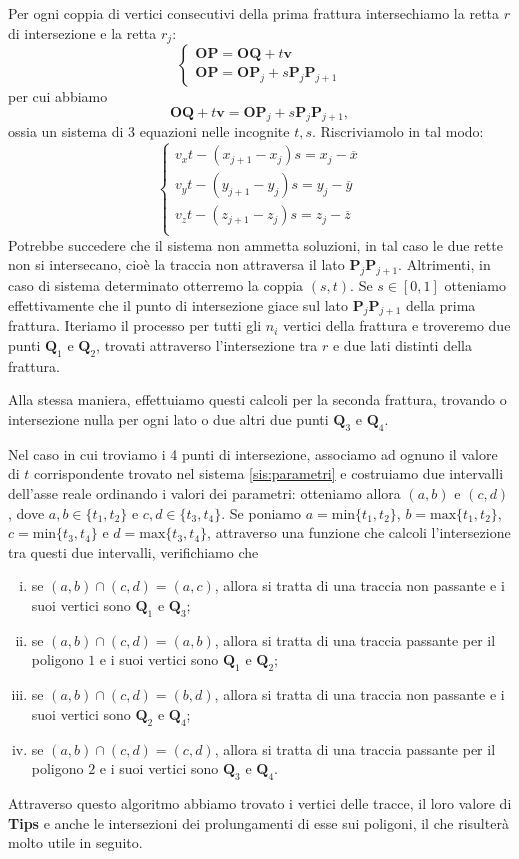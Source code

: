 \documentclass[a4paper]{article}
\newcommand{\B}{\mathbf}
\begin{document}
Per ogni coppia di vertici consecutivi della prima frattura intersechiamo la retta $r$ di intersezione e la retta $r_j$:
$$
\begin{cases}
\B{OP}=\B{OQ}+t\B{v} \\ 
\B{OP}=\B{OP}_j+s\B{P}_j\B{P}_{j+1}
\end{cases}
$$
per cui abbiamo $$\B{OQ}+t\B{v}=\B{OP}_j+s\B{P}_j\B{P}_{j+1},$$ ossia un sistema di $3$ equazioni nelle incognite $t,s$. Riscriviamolo in tal modo:
\begin{equation} \label{sis:parametri}
\begin{cases}
v_xt-(x_{j+1}-x_j)s=x_j-\overline{x} \\
v_yt-(y_{j+1}-y_j)s=y_j-\overline{y} \\
v_zt-(z_{j+1}-z_j)s=z_j-\overline{z} \\
\end{cases}
\end{equation}
Potrebbe succedere che il sistema non ammetta soluzioni, in tal caso le due rette non si intersecano, cioè la traccia non attraversa il lato $\B{P}_j\B{P}_{j+1}$. Altrimenti, in caso di sistema determinato otterremo la coppia $(s,t)$. Se $s\in[0,1]$ otteniamo effettivamente che il punto di intersezione giace sul lato $\B{P}_j\B{P}_{j+1}$ della prima frattura. Iteriamo il processo per tutti gli $n_i$ vertici della frattura e troveremo due punti $\B{Q}_1$ e $\B{Q}_2$, trovati attraverso l'intersezione tra $r$ e due lati distinti della frattura.

Alla stessa maniera, effettuiamo questi calcoli per la seconda frattura, trovando o intersezione nulla per ogni lato o due altri due punti $\B{Q}_3$ e $\B{Q}_4$.

Nel caso in cui troviamo i 4 punti di intersezione, associamo ad ognuno il valore di $t$ corrispondente trovato nel sistema \eqref{sis:parametri} e costruiamo due intervalli dell'asse reale ordinando i valori dei parametri: otteniamo allora $(a,b)$ e $(c,d)$, dove $a,b\in\{t_1,t_2\}$ e $c,d\in\{t_3,t_4\}$. Se poniamo $a=\text{min}\{t_1,t_2\}$, $b=\text{max}\{t_1,t_2\}$, $c=\text{min}\{t_3,t_4\}$ e $d=\text{max}\{t_3,t_4\}$, attraverso una funzione che calcoli l'intersezione tra questi due intervalli, verifichiamo che
\begin{enumerate} [(i)]
\item se $(a,b)\cap(c,d)=(a,c)$, allora si tratta di una traccia non passante e i suoi vertici sono $\B{Q}_1$ e $\B{Q}_3$;
\item se $(a,b)\cap(c,d)=(a,b)$, allora si tratta di una traccia passante per il poligono $1$ e i suoi vertici sono $\B{Q}_1$ e $\B{Q}_2$;
\item se $(a,b)\cap(c,d)=(b,d)$, allora si tratta di una traccia non passante e i suoi vertici sono $\B{Q}_2$ e $\B{Q}_4$;
\item se $(a,b)\cap(c,d)=(c,d)$, allora si tratta di una traccia passante per il poligono $2$ e i suoi vertici sono $\B{Q}_3$ e $\B{Q}_4$.
\end{enumerate}
Attraverso questo algoritmo abbiamo trovato i vertici delle tracce, il loro valore di \textbf{Tips} e anche le intersezioni dei prolungamenti di esse sui poligoni, il che risulterà molto utile in seguito.
\end{document}
